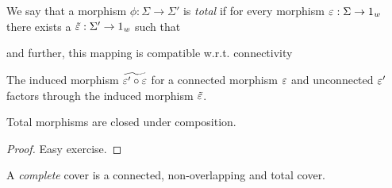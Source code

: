 \begin{definition}
    We say that a morphism $\phi : \Sigma \to \Sigma'$ is \emph{total} if for every morphism $\varepsilon : \Sigma \to 1_{\mathit{w}}$ 
    there exists a $\tilde{\varepsilon} : \Sigma' \to 1_{\mathit{w}}$ such that
    \begin{center}
    \end{center}
    and further, this mapping is compatible w.r.t. connectivity
    \begin{center}
    \end{center}
    The induced morphism $\widetilde{\varepsilon'\circ \varepsilon}$ for a connected morphism $\varepsilon$ and unconnected $\varepsilon'$ factors through the induced morphism $\tilde{\varepsilon}$.
\end{definition}
\begin{lemma}
    Total morphisms are closed under composition.
\end{lemma}
\begin{proof}Easy exercise.\end{proof}

\begin{definition}
    A \emph{complete} cover is a connected, non-overlapping and total cover.
\end{definition}

